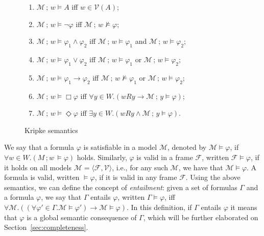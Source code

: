 \documentclass[3p,times]{elsarticle}
\begin{document}
\begin{figure}[H]
\begin{enumerate}
  \item $\mathcal{M}\,;\,w\models A$ iff $w \in \mathcal{V}(A)$;
  \item $\mathcal{M}\,;\,w\models \neg\varphi$ iff $\mathcal{M}\,;\,w\not\models\varphi$;
  \item $\mathcal{M}\,;\,w\models \varphi_1 \land \varphi_2$ iff
    $\mathcal{M}\,;\,w\models\varphi_1$ and $\mathcal{M}\,;\,w\models\varphi_2$;
  \item $\mathcal{M}\,;\,w\models \varphi_1 \lor \varphi_2$ iff
    $\mathcal{M}\,;\,w\models\varphi_1$ or $\mathcal{M}\,;\,w\models\varphi_2$;
  \item $\mathcal{M}\,;\,w\models \varphi_1 \to \varphi_2$ iff
    $\mathcal{M}\,;\,w\not\models\varphi_1$ or $\mathcal{M}\,;\,w\models\varphi_2$;
  \item $\mathcal{M}\,;\,w\models\Box\varphi$ iff $\forall y \in W. (w R y \to \mathcal{M}\,;\,y \models\varphi)$;
  \item $\mathcal{M}\,;\,w\models\Diamond\varphi$ iff $\exists y \in W. (w R y \land \mathcal{M}\,;\,y \models\varphi)$.
  \end{enumerate}
  \caption{Kripke semantics}
  \label{fig:kripke}
\end{figure}
We say that a formula $\varphi$ is satisfiable in a model $\mathcal{M}$,
denoted by $\mathcal{M}\models \varphi$, if $\forall w \in W. (M\,;w\,\models \varphi)$ holds.
Similarly, $\varphi$ is valid in a frame $\mathcal{F}$, written $\mathcal{F}\models\varphi$, if
it holds on all models $\mathcal{M} = \langle \mathcal{F},\mathcal{V}\rangle$, i.e.,
for any such $\mathcal{M}$, we have that $\mathcal{M}\models\varphi$. A formula
is valid, written $\models \varphi$, if it is valid in any frame $\mathcal{F}$. Using the above semantics, we can define the concept of \emph{entailment}: given a set
of formulas $\Gamma$ and a formula $\varphi$, we say that $\Gamma$ entails
$\varphi$, written $\Gamma\models\varphi$, iff $\forall \mathcal{M} . ((\forall \varphi' \in\Gamma .
\mathcal{M} \models \varphi') \to \mathcal{M} \models \varphi)$.
In this definition, if $\Gamma$ entails $\varphi$ it means that $\varphi$ is a global semantic consequence of $\Gamma$, which will be further elaborated on Section~\ref{sec:completeness}.
\end{document}
